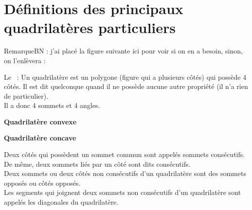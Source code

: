 \section{Définitions des principaux quadrilatères particuliers}
RemarqueBN : j'ai placé la figure suivante ici pour voir si on en a besoin, sinon, on l'enlèvera :

\begin{definition}
Le  :
Un quadrilatère est un polygone (figure qui a plusieurs côtés) qui possède 4 côtés. Il est dit quelconque quand il ne possède aucune autre propriété (il n'a rien de particulier).\\
Il a donc 4 sommets et 4 angles.\\


\begin{minipage}[t]{0.50\linewidth}
\begin{center} \textbf{Quadrilatère convexe}\\
\end{center}
\end{minipage}
\begin{minipage}[t]{0.50\linewidth}
\begin{center}\textbf{Quadrilatère concave}\\
\end{center}
\end{minipage}
\end{definition}

Deux côtés qui possèdent un sommet commun sont appelés 
\textcolor{B2}{sommets consécutifs}. De même, deux sommets liés par un côté sont dits \textcolor{B2}{consécutifs}.\\
Deux sommets ou deux côtés non consécutifs d'un quadrilatère sont des \textcolor{B2}{sommets opposés} ou \textcolor{B2}{côtés opposés}.\\
Les segments qui joignent deux sommets non consécutifs d'un quadrilatère sont appelés \textcolor{B2}{les diagonales} du quadrilatère.
\begin{center}
   
\end{center}

